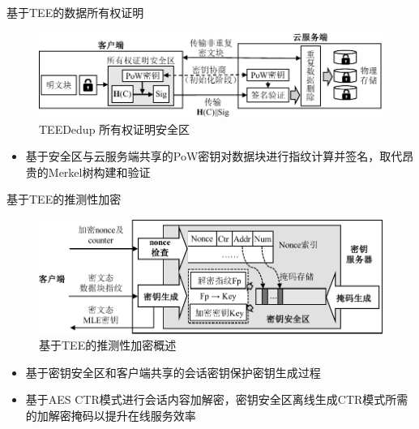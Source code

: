 \documentclass{beamer}
\newcommand{\sysnameS}{TEEDedup }
\begin{document}
\begin{frame}{基于TEE的数据所有权证明}
    \begin{figure}[!htb]
        \centering
        \includegraphics[width=\textwidth]{../pic/sgxdedup/pow.pdf}
        \caption{\sysnameS 所有权证明安全区}
        \label{fig:sgxdedup-overview-pow}
    \end{figure}
    \vspace{-1em}
    \begin{itemize}
        \item  基于安全区与云服务端共享的PoW密钥对数据块进行指纹计算并签名，取代昂贵的Merkel树构建和验证
    \end{itemize}
\end{frame}

\begin{frame}{基于TEE的推测性加密}
    \begin{figure}[!htb]
        \centering
        \includegraphics[width=\textwidth]{../pic/sgxdedup/key-enclave-arch.pdf}
        \caption{基于TEE的推测性加密概述}
        \label{fig:sgxdedup-SpecEnc}
      \end{figure}
      \vspace{-1em}
      \begin{itemize}
        \item  基于密钥安全区和客户端共享的会话密钥保护密钥生成过程
        \item 基于AES CTR模式进行会话内容加解密，密钥安全区离线生成CTR模式所需的加解密掩码以提升在线服务效率
    \end{itemize}
\end{frame}
\end{document}
